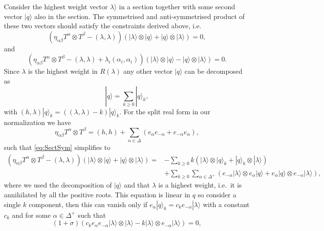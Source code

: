 Consider the highest weight vector $\lambda\rangle$ in a section together with some second vector $|q\rangle$ also in the section. The symmetrised and anti-symmetrised product of these two vectors should satisfy the constraints derived above, i.e.\
\begin{equation}\label{eq:SectSym}
    \left(\eta_{\alpha\beta}T^\alpha\otimes T^\beta-(\lambda,\lambda)\right)\left(|\lambda\rangle\otimes|q\rangle+|q\rangle\otimes|\lambda\rangle\right)=0,
\end{equation}
and 
\begin{equation}
    \left(\eta_{\alpha\beta}T^\alpha\otimes T^\beta-(\lambda,\lambda)+\lambda_i(\alpha_i,\alpha_i)\right)\left(|\lambda\rangle\otimes|q\rangle-|q\rangle\otimes|\lambda\rangle\right)=0.
\end{equation}
Since $\lambda$ is the highest weight in $R(\lambda)$ any other vector $|q\rangle$ can be decomposed as 
\begin{equation}
    |q\rangle = \sum_{k\geq 0} |q\rangle_k,
\end{equation}
with $(h,\lambda)|q\rangle_k = ((\lambda,\lambda)-k)|q\rangle_k$. For the split real form in our normalization we have 
\begin{equation}
    \eta_{\alpha\beta}T^\alpha\otimes T^\beta = (h,h)+\sum_{\alpha\in\Delta}\left(e_\alpha e_{-\alpha}+e_{-\alpha}e_\alpha\right),
\end{equation}
such that \eqref{eq:SectSym} simplifies to 
\begin{equation}
    \begin{aligned}
    \left(\eta_{\alpha\beta}T^\alpha\otimes T^\beta-(\lambda,\lambda)\right)\left(|\lambda\rangle\otimes|q\rangle+|q\rangle\otimes|\lambda\rangle\right) =& -\sum_{k\geq 0} k\left(|\lambda\rangle\otimes|q\rangle_k+|q\rangle_k\otimes|\lambda\rangle\right)\\
    &+ \sum_{k\geq 0}\sum_{\alpha\in\Delta^+} \left(e_{-\alpha}|\lambda\rangle\otimes e_{\alpha}|q\rangle+e_{\alpha}|q\rangle\otimes e_{-\alpha}|\lambda\rangle\right),
    \end{aligned}
\end{equation}
where we used the decomposition of $|q\rangle$ and that $\lambda$ is a highest weight, i.e.\ it is annihilated by all the positive roots. This equation is linear in $q$ so consider a single $k$ component, then this can vanish only if $e_\alpha|q\rangle_k= c_ke_{-\alpha}|\lambda\rangle$ with a constant $c_k$ and for some $\alpha\in\Delta^+$ such that 
\begin{equation}
    \left(1+\sigma\right)\left(c_ke_{\alpha}e_{-\alpha}|\lambda\rangle\otimes|\lambda\rangle-k|\lambda\rangle\otimes e_{-\alpha}|\lambda\rangle\right) = 0,
\end{equation}
